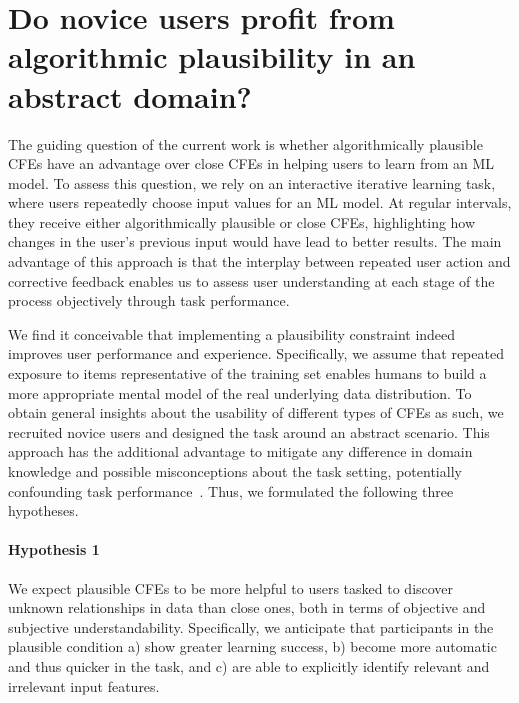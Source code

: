 \section{Do novice users profit from algorithmic plausibility in an abstract domain?}\label{sec:hypotheses}


The guiding question of the current work is whether algorithmically plausible \glspl{CFE} have an advantage over close \glspl{CFE} in helping users to learn from an \gls{ML} model.
To assess this question, we rely on an interactive iterative learning task, where users repeatedly choose input values for an \gls{ML} model.
At regular intervals, they receive either algorithmically plausible or close \glspl{CFE}, highlighting how changes in the user's previous input would have lead to better results.
The main advantage of this approach is that the interplay between repeated user action and corrective feedback enables us to assess user understanding at each stage of the process objectively through task performance.

We find it conceivable that implementing a plausibility constraint indeed improves user performance and experience. 
Specifically, we assume that repeated exposure to items representative of the training set enables humans to build a more appropriate mental model of the real underlying data distribution.
To obtain general insights about the usability of different types of \glspl{CFE} as such, we recruited novice users and designed the task around an abstract scenario.
This approach has the additional advantage to mitigate any difference in domain knowledge and possible misconceptions about the task setting, potentially confounding task performance~\citep{van_der_waa_evaluating_2021}.
Thus, we formulated the following three hypotheses.

\paragraph{Hypothesis 1} We expect plausible \glspl{CFE} to be more helpful to users tasked to discover unknown relationships in data than close ones, both in terms of objective and subjective understandability. 
Specifically, we anticipate that participants in the plausible condition a) show greater learning success, b) become more automatic and thus quicker in the task, and c) are able to explicitly identify relevant and irrelevant input features.

